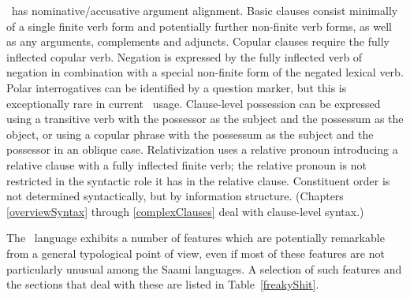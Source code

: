 \PS\ has nominative/accusative argument alignment. 
Basic clauses consist minimally of a single finite verb form and potentially further non-finite verb forms, %
as well as any arguments, complements and adjuncts. Copular clauses require the fully inflected copular verb. Negation is expressed by the fully inflected verb of negation in combination with a special non-finite form of the negated lexical verb. Polar interrogatives can be identified by a question marker, but this is exceptionally rare in current \PS\ usage. Clause-level possession can be expressed using a transitive verb with the possessor as the subject and the possessum as the object, or using a copular phrase with the possessum as the subject and the possessor in an oblique case. Relativization uses a relative pronoun introducing a relative clause with a fully inflected finite verb; the relative pronoun is not restricted in the syntactic role it has in the relative clause. Constituent order is not determined syntactically, but by information structure. (Chapters \ref{overviewSyntax} through \ref{complexClauses} deal with clause-level syntax.) 

The \PS\ language exhibits a number of features which are potentially remarkable from a general typological point of view, even if most of these features are not particularly unusual among the Saami languages. A selection of such features and the sections that deal with these are listed in Table~\vref{freakyShit}. 

